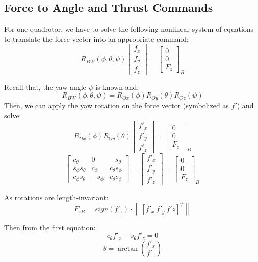 \documentclass[a4paper, 12pt]{report}
\newcommand\norm[1]{\left\lVert#1\right\rVert}
\begin{document}
\subsection{Force to Angle and Thrust Commands}
\label{sec:ForceToAngle}
For one quadrotor, we have to solve the following nonlinear system of equations to translate the force vector into an appropriate command:
\[ R_{BW}(\phi, \theta, \psi) \begin{bmatrix}  f_x\\ f_y\\ f_z \end{bmatrix} = \begin{bmatrix}  0\\ 0\\ F_z \end{bmatrix}_B\]

Recall that, the yaw angle $\psi$ is known and:
\[R_{BW}(\phi, \theta, \psi)= R_{Ox}(\phi) R_{Oy}(\theta) R_{Oz}(\psi) \]
Then, we can apply the yaw rotation on the force vector (symbolized as $f'$) and solve:
\[ R_{Ox}(\phi) R_{Oy}(\theta) \begin{bmatrix}  f'_x\\ f'_y\\ f'_z \end{bmatrix} = \begin{bmatrix}  0\\ 0\\ F_z \end{bmatrix}_B \]
\[ \begin{bmatrix}  c_\theta & 0  & -s_\theta  \\ s_\phi s_\theta   & c_\phi & c_\theta s_\phi  \\ c_\phi s_\theta & - s_\phi  & c_\theta c_\phi  \end{bmatrix}   = \begin{bmatrix}  f'_x\\ f'_y\\ f'_z \end{bmatrix} = \begin{bmatrix}  0\\ 0\\ F_z \end{bmatrix}_B \]

As rotations are length-invariant:
\[ F_{zB} = sign(f'_z) \cdot \norm {[f'_x\ f'_y\ f'z]^T} \]

Then from the first equation:
\[ c_\theta f'_x - s_\theta f'_z = 0 \]
\[ \theta =  \arctan \left( \frac{f'_x}{f'_z}\right)\]
\end{document}
